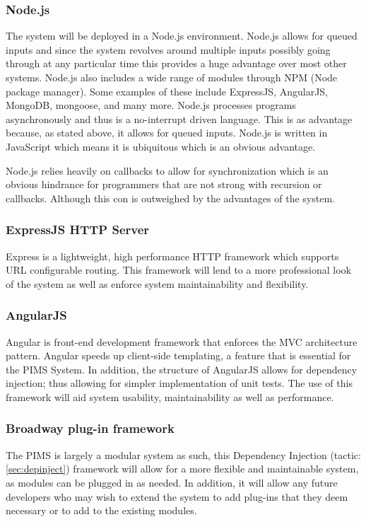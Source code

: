\subsubsection{Node.js}
The system will be deployed in a Node.js environment. Node.js allows for queued inputs and since the system revolves around multiple inputs possibly going through at any particular time this provides a huge advantage over most other systems. Node.js also includes a wide range of modules through NPM (Node package manager). Some examples of these include ExpressJS, AngularJS, MongoDB, mongoose, and many more. Node.js processes programs asynchronously and thus is a no-interrupt driven language. This is as advantage because, as stated above, it allows for queued inputs. Node.js is written in JavaScript which means it is ubiquitous which is an obvious advantage.

Node.js relies heavily on callbacks to allow for synchronization which is an obvious hindrance for programmers that are not strong with recursion or callbacks. Although this con is outweighed by the advantages of the system.

\subsubsection{ExpressJS HTTP Server}
Express is a lightweight, high performance HTTP framework which supports URL configurable routing. This framework will lend to a more professional look of the system as well as enforce system maintainability and flexibility.

\subsubsection{AngularJS}
Angular is front-end development framework that enforces the MVC architecture pattern. Angular speeds up client-side templating, a feature that is essential for the PIMS System. In addition, the structure of AngularJS allows for dependency injection; thus allowing for simpler implementation of unit tests. The use of this framework will aid system usability, maintainability as well as performance.

\subsubsection{Broadway plug-in framework}
The PIMS is largely a modular system as such, this Dependency Injection (tactic: \ref{sec:depinject}) framework will allow for a more flexible and maintainable system, as modules can be plugged in as needed. In addition, it will allow any future developers who may wish to extend the system to add plug-ins that they deem necessary or to add to the existing modules.

